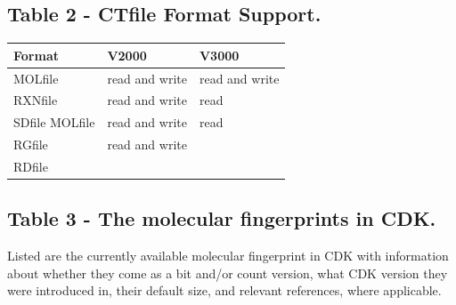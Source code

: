 \documentclass[doublespacing]{bmcart}
\begin{document}
\begin{backmatter}
      \subsection*{Table 2 - CTfile Format Support.}\label{tab:ctfileFormats}

    \begin{minipage}{1\textwidth}
    \renewcommand*{\thempfootnote}{\fnsymbol{mpfootnote}}
    \centering
    \begin{tabular}{lll}
  \textbf{Format}            & \textbf{V2000}  & \textbf{V3000} \\ \hline
    MOLfile & read and write & read and write \\
    RXNfile & read and write & read \\
    SDfile MOLfile & read and write & read \\ %
    RGfile & read and write & \\
    RDfile & & \\ %
    \end{tabular}
    \end{minipage}


  \subsection*{Table 3 - The molecular fingerprints in CDK.}
  \label{tab:fingerprints}
  Listed are the currently available molecular fingerprint in CDK with
  information about whether they come as a bit and/or count version, what CDK version
  they were introduced in, their default size, and relevant
  references, where applicable.
  \baselineskip


\end{backmatter}
\end{document}
